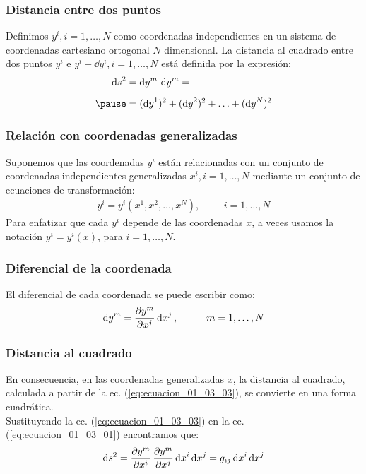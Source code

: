 \documentclass[12pt]{beamer}
\begin{document}
\begin{frame}
\frametitle{Distancia entre dos puntos}
Definimos $y^{i}, i = 1, \ldots, N$ como coordenadas independientes en un sistema de coordenadas cartesiano ortogonal $N$ dimensional. \pause La distancia al cuadrado entre dos puntos $y^{i}$ e $y^{i} + \dd{y}^{i}, i = 1, \ldots, N$ está definida por la expresión:
\pause
\begin{eqnarray}
\begin{aligned}
\dd{s}^{2} &= \dd{y}^{m} \, \dd{y}^{m} = \\[0.5em] \pause
&= (\dd{y}^{1})^{2} + (\dd{y}^{2})^{2} + \ldots + (\dd{y}^{N})^{2}
\end{aligned}
\label{eq:ecuacion_01_03_01}
\end{eqnarray}
\end{frame}
\begin{frame}
\frametitle{Relación con coordenadas generalizadas}
Suponemos que las coordenadas $y^{i}$ están relacionadas con un conjunto de coordenadas independientes generalizadas $x^{i}, i = 1, \ldots, N$ mediante un conjunto de ecuaciones de transformación:
\pause
\begin{align}
y^{i} = y^{i} (x^{1}, x^{2}, \ldots, x^{N}), \hspace{1cm} i = 1, \ldots, N
\label{eq:ecuacion_01_03_02}
\end{align}
\pause
Para enfatizar que cada $y^{i}$ depende de las coordenadas $x$, a veces usamos la notación $y^{i} = y^{i} (x)$, para $i = 1, \ldots, N$.
\end{frame}
\begin{frame}
\frametitle{Diferencial de la coordenada}
El diferencial de cada coordenada se puede escribir como:
\pause
\begin{align}
\dd{y}^{m} = \pdv{y^{m}}{x^{j}} \dd{x}^{j}, \hspace{1cm} m = 1, \ldots, N
\label{eq:ecuacion_01_03_03}
\end{align}
\end{frame}
\begin{frame}
\frametitle{Distancia al cuadrado}
En consecuencia, en las coordenadas generalizadas $x$, la distancia al cuadrado, calculada a partir de la ec. (\ref{eq:ecuacion_01_03_03}), se convierte en una forma cuadrática.
\\
\bigskip
\pause
Sustituyendo la ec. (\ref{eq:ecuacion_01_03_03}) en la ec. (\ref{eq:ecuacion_01_03_01}) encontramos que:
\pause
\begin{align}
\dd{s}^{2} = \pdv{y^{m}}{x^{i}} \, \pdv{y^{m}}{x^{j}} \dd{x}^{i} \dd{x}^{j} = g_{ij} \dd{x}^{i} \dd{x}^{j}
\label{eq:ecuacion_01_03_04}
\end{align}
\end{frame}
\end{document}
